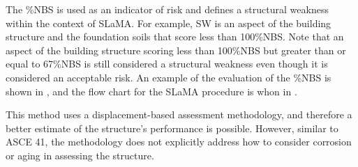 The \%NBS is used as an indicator of risk and defines a structural weakness within the context of SLaMA. For example, SW is an aspect of the building structure and the foundation soils that score less than 100\%NBS. Note that an aspect of the building structure scoring less than 100\%NBS but greater than or equal to 67\%NBS is still considered a structural weakness even though it is considered an acceptable risk. An example of the evaluation of the \%NBS is shown in \fref{}, and the flow chart for the SLaMA procedure is whon in .

This method uses a displacement-based assessment methodology, and therefore a better estimate of the structure's performance is possible. However, similar to ASCE 41, the methodology does not explicitly address how to consider corrosion or aging in assessing the structure.

